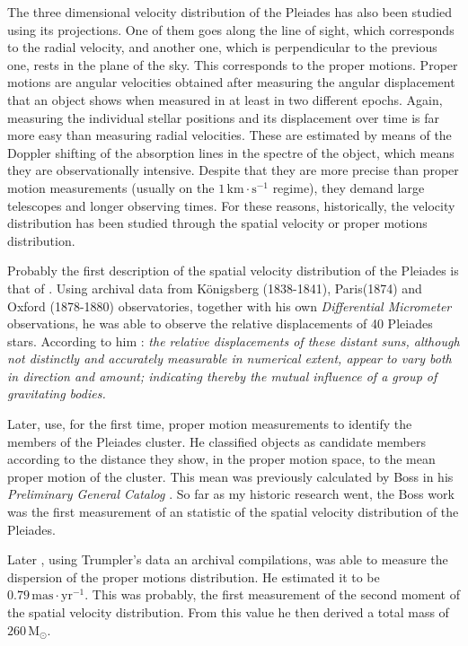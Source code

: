 The three dimensional velocity distribution of the Pleiades has also been studied using its projections. One of them goes along the line of sight, which corresponds to the radial velocity, and another one, which is perpendicular to the previous one, rests in the plane of the sky. This corresponds to the proper motions. Proper motions are angular velocities obtained after measuring the angular displacement that an object shows when measured in at least in two different epochs. Again, measuring the individual stellar positions and its displacement over time is far more easy than measuring radial velocities. These are estimated by means of the Doppler shifting of the absorption lines in the spectre of the object, which means they are observationally intensive.  Despite that they are more precise than proper motion measurements (usually on the $1 \,\mathrm{km\cdot s^{-1}}$ regime), they demand large telescopes and longer observing times. For these reasons, historically, the velocity distribution has been studied through the spatial velocity or proper motions distribution. 

Probably the first description of the spatial velocity distribution of the Pleiades is that of \citet{1884MNRAS..44..355P}. Using archival data from  Königsberg (1838-1841), Paris(1874) and Oxford (1878-1880) observatories, together with his own \emph{Differential Micrometer} observations, he was able to observe the relative displacements of 40 Pleiades stars. According to him \citep{1884MNRAS..44..355P}: \textit{the relative displacements of these distant suns, although not distinctly and accurately measurable in numerical extent, appear to vary both in direction and amount; indicating thereby the mutual influence of a group of gravitating bodies.} 

Later, \citet{Trumpler1921} use, for the first time, proper motion measurements to identify the members of the Pleiades cluster. He classified objects as candidate members according to the distance they show, in the proper motion space, to the mean proper motion of the cluster. This mean was previously calculated by Boss in his \emph{Preliminary General Catalog} \citep{Trumpler1921}. So far as my historic research went, the Boss work was the first measurement of an statistic of the spatial velocity distribution of the Pleiades. 

Later \citet{1938AJ.....47...25T}, using Trumpler's data an archival compilations, was able to measure the dispersion of the proper motions distribution. He estimated it to be $0.79\,\mathrm{mas\cdot yr^{-1}}$. This was probably, the first measurement of the second moment of the spatial velocity distribution. From this value he then derived a total mass of $260\,\mathrm{M_{\odot}}$.


